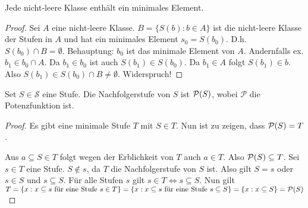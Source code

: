
\begin{satz}
	Jede nicht-leere Klasse enthält ein minimales Element.
\end{satz}
\begin{proof}
	Sei $A$ eine nicht-leere Klasse. $B=\{S(b) : b \in A\}$ ist die nicht-leere Klasse der Stufen in $A$ und hat ein minimales Element $s_0=S(b_0)$. D.h. $S(b_0)\cap B = \emptyset$. 
	Behauptung: $b_0$ ist das minimale Element von $A$. Andernfalls ex. $b_1\in b_0\cap A$. Da $b_1 \in b_0$ ist auch $S(b_1)\in S(b_0)$. Da $b_1\in A$ folgt $S(b_1)\in b$. Also $S(b_1)\in S(b_0)\cap B \neq \emptyset$. Widerspruch!
\end{proof}

\begin{lemma}
	Set $S\in \mathcal{S}$ eine Stufe. Die Nachfolgerstufe von $S$ ist $\mathcal{P}(S)$, wobei $\mathcal{P}$ die Potenzfunktion ist.
\end{lemma}
\begin{proof}
	Es gibt eine minimale Stufe $T$ mit $S\in T$. Nun ist zu zeigen, dass $\mathcal{P}(S)=T$.
	
	Aus $a\subseteq S\in T$ folgt wegen der Erblichkeit von $T$ auch $a\in T$. Also $\mathcal{P}(S)\subseteq T$. Sei $s \in T$ eine Stufe. $S\notin s$, da $T$ die Nachfolgerstufe von $S$ ist. Also gilt $S=s$ oder $s\in S$ und $s\subseteq S$. Für alle Stufen $s$ gilt $s\in T \Leftrightarrow s\subseteq S$. Nun gilt $T=\{x : x\subseteq s \text{ für eine Stufe } s\in T\}=\{x : x \subseteq s \text{ für eine Stufe } s\subseteq S\}=\{x : x \subseteq S\}=\mathcal{P}(S)$
\end{proof}

